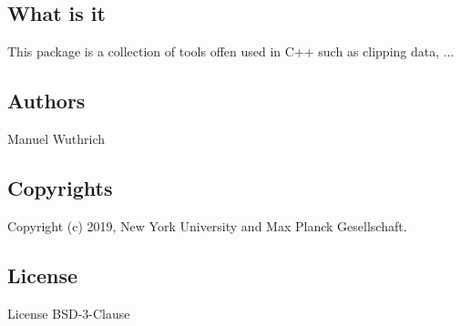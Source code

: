 \subsection*{What is it}

This package is a collection of tools offen used in C++ such as clipping data, ...

\subsection*{Authors}

Manuel Wuthrich

\subsection*{Copyrights}

Copyright (c) 2019, New York University and Max Planck Gesellschaft.

\subsection*{License}

License B\+S\+D-\/3-\/\+Clause 